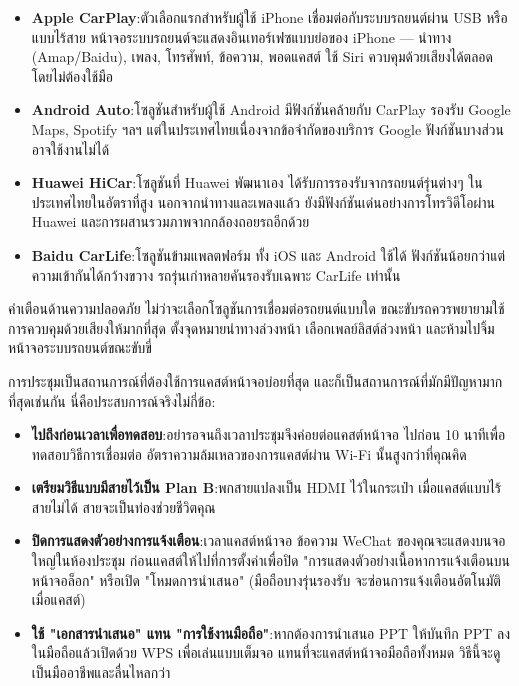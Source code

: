 \begin{itemize}
  \item \textbf{Apple CarPlay}:ตัวเลือกแรกสำหรับผู้ใช้ iPhone เชื่อมต่อกับระบบรถยนต์ผ่าน USB หรือแบบไร้สาย หน้าจอระบบรถยนต์จะแสดงอินเทอร์เฟซแบบย่อของ iPhone — นำทาง (Amap/Baidu), เพลง, โทรศัพท์, ข้อความ, พอดแคสต์ ใช้ Siri ควบคุมด้วยเสียงได้ตลอดโดยไม่ต้องใช้มือ
  \item \textbf{Android Auto}:โซลูชันสำหรับผู้ใช้ Android มีฟังก์ชันคล้ายกับ CarPlay รองรับ Google Maps, Spotify ฯลฯ แต่ในประเทศไทยเนื่องจากข้อจำกัดของบริการ Google ฟังก์ชันบางส่วนอาจใช้งานไม่ได้
  \item \textbf{Huawei HiCar}:โซลูชันที่ Huawei พัฒนาเอง ได้รับการรองรับจากรถยนต์รุ่นต่างๆ ในประเทศไทยในอัตราที่สูง นอกจากนำทางและเพลงแล้ว ยังมีฟังก์ชันเด่นอย่างการโทรวิดีโอผ่าน Huawei และการผสานรวมภาพจากกล้องถอยรถอีกด้วย
  \item \textbf{Baidu CarLife}:โซลูชันข้ามแพลตฟอร์ม ทั้ง iOS และ Android ใช้ได้ ฟังก์ชันน้อยกว่าแต่ความเข้ากันได้กว้างขวาง รถรุ่นเก่าหลายคันรองรับเฉพาะ CarLife เท่านั้น
\end{itemize}

\begin{tcbwarn}{คำเตือนด้านความปลอดภัย}
ไม่ว่าจะเลือกโซลูชันการเชื่อมต่อรถยนต์แบบใด ขณะขับรถควรพยายามใช้การควบคุมด้วยเสียงให้มากที่สุด ตั้งจุดหมายนำทางล่วงหน้า เลือกเพลย์ลิสต์ล่วงหน้า และห้ามไปจิ้มหน้าจอระบบรถยนต์ขณะขับขี่

\end{tcbwarn}


การประชุมเป็นสถานการณ์ที่ต้องใช้การแคสต์หน้าจอบ่อยที่สุด และก็เป็นสถานการณ์ที่มักมีปัญหามากที่สุดเช่นกัน นี่คือประสบการณ์จริงไม่กี่ข้อ:

\begin{itemize}
  \item \textbf{ไปถึงก่อนเวลาเพื่อทดสอบ}:อย่ารอจนถึงเวลาประชุมจึงค่อยต่อแคสต์หน้าจอ ไปก่อน 10 นาทีเพื่อทดสอบวิธีการเชื่อมต่อ อัตราความล้มเหลวของการแคสต์ผ่าน Wi-Fi นั้นสูงกว่าที่คุณคิด
  \item \textbf{เตรียมวิธีแบบมีสายไว้เป็น Plan B}:พกสายแปลงเป็น HDMI ไว้ในกระเป๋า เมื่อแคสต์แบบไร้สายไม่ได้ สายจะเป็นท่องช่วยชีวิตคุณ
  \item \textbf{ปิดการแสดงตัวอย่างการแจ้งเตือน}:เวลาแคสต์หน้าจอ ข้อความ WeChat ของคุณจะแสดงบนจอใหญ่ในห้องประชุม ก่อนแคสต์ให้ไปที่การตั้งค่าเพื่อปิด "การแสดงตัวอย่างเนื้อหาการแจ้งเตือนบนหน้าจอล็อก" หรือเปิด "โหมดการนำเสนอ" (มือถือบางรุ่นรองรับ จะซ่อนการแจ้งเตือนอัตโนมัติเมื่อแคสต์)
  \item \textbf{ใช้ "เอกสารนำเสนอ" แทน "การใช้งานมือถือ"}:หากต้องการนำเสนอ PPT ให้บันทึก PPT ลงในมือถือแล้วเปิดด้วย WPS เพื่อเล่นแบบเต็มจอ แทนที่จะแคสต์หน้าจอมือถือทั้งหมด วิธีนี้จะดูเป็นมืออาชีพและลื่นไหลกว่า
\end{itemize}

